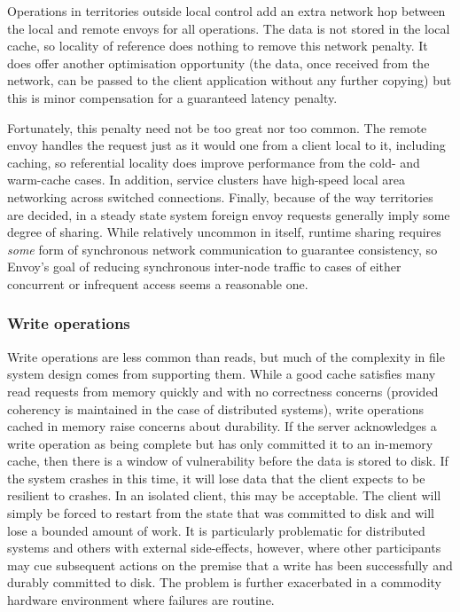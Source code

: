 Operations in territories outside local control add an extra network hop between the local and remote envoys for all operations. The data is not stored in the local cache, so locality of reference does nothing to remove this network penalty. It does offer another optimisation opportunity (the data, once received from the network, can be passed to the client application without any further copying) but this is minor compensation for a guaranteed latency penalty.

Fortunately, this penalty need not be too great nor too common. The remote envoy handles the request just as it would one from a client local to it, including caching, so referential locality does improve performance from the cold- and warm-cache cases. In addition, service clusters have high-speed local area networking across switched connections. Finally, because of the way territories are decided, in a steady state system foreign envoy requests generally imply some degree of sharing. While relatively uncommon in itself, runtime sharing requires \emph{some} form of synchronous network communication to guarantee consistency, so Envoy's goal of reducing synchronous inter-node traffic to cases of either concurrent or infrequent access seems a reasonable one.

\subsubsection{Write operations}\label{sec:data-paths-write}

Write operations are less common than reads, but much of the complexity in file system design comes from supporting them. While a good cache satisfies many read requests from memory quickly and with no correctness concerns (provided coherency is maintained in the case of distributed systems), write operations cached in memory raise concerns about durability. If the server acknowledges a write operation as being complete but has only committed it to an in-memory cache, then there is a window of vulnerability before the data is stored to disk. If the system crashes in this time, it will lose data that the client expects to be resilient to crashes. In an isolated client, this may be acceptable. The client will simply be forced to restart from the state that was committed to disk and will lose a bounded amount of work. It is particularly problematic for distributed systems and others with external side-effects, however, where other participants may cue subsequent actions on the premise that a write has been successfully and durably committed to disk. The problem is further exacerbated in a commodity hardware environment where failures are routine.

